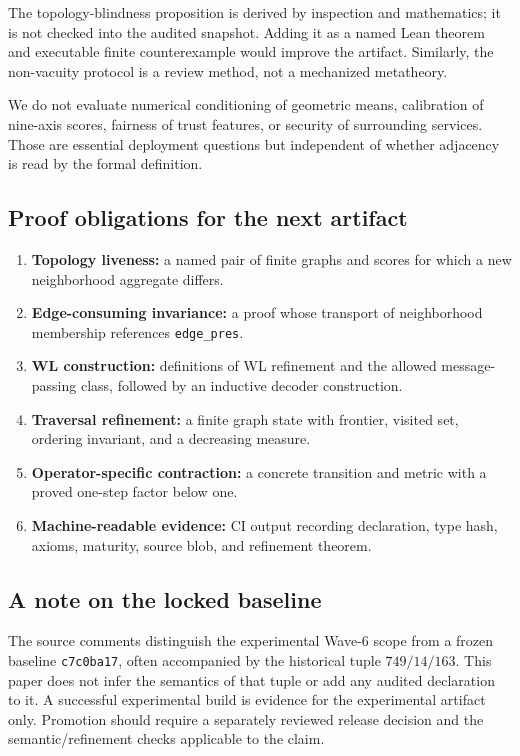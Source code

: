 \documentclass[10pt,letterpaper]{article}
\theoremstyle{definition}
\newcommand{\baseline}{\texttt{c7c0ba17}}
\begin{document}
The topology-blindness proposition is derived by inspection and mathematics;
it is not checked into the audited snapshot. Adding it as a named Lean theorem
and executable finite counterexample would improve the artifact. Similarly,
the non-vacuity protocol is a review method, not a mechanized metatheory.

We do not evaluate numerical conditioning of geometric means, calibration of
nine-axis scores, fairness of trust features, or security of surrounding
services. Those are essential deployment questions but independent of whether
adjacency is read by the formal definition.

\subsection{Proof obligations for the next artifact}
\begin{enumerate}
\item \textbf{Topology liveness:} a named pair of finite graphs and scores for
  which a new neighborhood aggregate differs.
\item \textbf{Edge-consuming invariance:} a proof whose transport of
  neighborhood membership references \texttt{edge\_pres}.
\item \textbf{WL construction:} definitions of WL refinement and the allowed
  message-passing class, followed by an inductive decoder construction.
\item \textbf{Traversal refinement:} a finite graph state with frontier,
  visited set, ordering invariant, and a decreasing measure.
\item \textbf{Operator-specific contraction:} a concrete transition and metric
  with a proved one-step factor below one.
\item \textbf{Machine-readable evidence:} CI output recording declaration,
  type hash, axioms, maturity, source blob, and refinement theorem.
\end{enumerate}

\subsection{A note on the locked baseline}
The source comments distinguish the experimental Wave-6 scope from a frozen
baseline \baseline, often accompanied by the historical tuple
\(749/14/163\). This paper does not infer the semantics of that tuple or add any
audited declaration to it. A successful experimental build is evidence for the
experimental artifact only. Promotion should require a separately reviewed
release decision and the semantic/refinement checks applicable to the claim.
\end{document}
